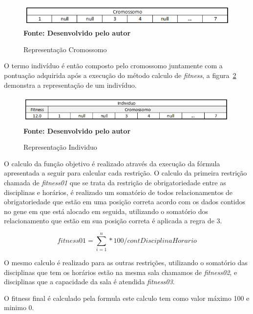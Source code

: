 \begin{figure}[!htb]
\caption[Representação Cromossomo]{Representação Cromossomo}
\label{fig:cromossomo}
\centering
\includegraphics[scale=0.8]{imagens/representacaoCromossomo.png}
\\ \textbf{\footnotesize Fonte: Desenvolvido pelo autor}
\end{figure}

O termo indivíduo é então composto pelo cromossomo juntamente com a pontuação adquirida após a execução do método calculo de \textit{fitness}, a figura~\ref{fig:individuo} demonstra a representação de um indivíduo.\par

\begin{figure}[!htb]
\caption[Representação Individuo]{Representação Individuo}
\label{fig:individuo}
\centering
\includegraphics[scale=0.8]{imagens/representacaoIndividuo.png}
\\ \textbf{\footnotesize Fonte: Desenvolvido pelo autor}
\end{figure}


O calculo da função objetivo é realizado através da execução da fórmula apresentada a seguir para calcular cada restrição. O calculo da primeira restrição chamada de \textit{fitness01} que se trata da restrição de obrigatoriedade entre as disciplinas e horários, é realizado um somatório de todos relacionamentos de obrigatoriedade que estão em uma posição correta acordo com os dados contidos no gene em que está alocado em seguida, utilizando o somatório dos relacionamento que estão em sua posição correta é aplicada a regra de 3.


$$fitness01 = \sum_{i=1}^n * 100 / contDisciplinaHorario$$ 

O mesmo calculo é realizado para as outras restrições, utilizando o somatório das disciplinas que tem os horários estão na mesma sala chamamos de \textit{fitness02}, e disciplinas que a capacidade da sala é atendida \textit{fitness03}.

O fitness final é calculado pela formula este calculo tem como valor máximo 100 e minimo 0.

